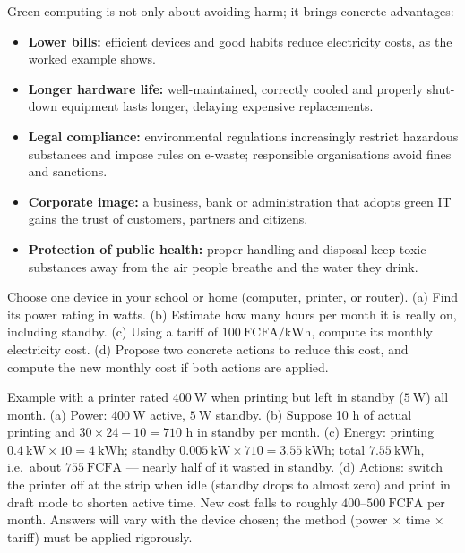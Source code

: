 \documentclass[11pt]{article}
\newcounter{popsec}
\newcounter{popsub}
\newcommand{\courssub}[1]{%
  \stepcounter{popsub}%
  \par\vspace{9pt}\noindent{\popxbold\fontsize{11.5}{13}\selectfont\color{popink}{\color{poporange}\thepopsec.\thepopsub}\hspace{6pt}#1}\par\nopagebreak\vspace{4pt}
}
\begin{document}
\courssub{Benefits of Green Computing}

Green computing is not only about avoiding harm; it brings concrete advantages:

\begin{itemize}
\item \textbf{Lower bills:} efficient devices and good habits reduce electricity costs, as the worked example shows.
\item \textbf{Longer hardware life:} well-maintained, correctly cooled and properly shut-down equipment lasts longer, delaying expensive replacements.
\item \textbf{Legal compliance:} environmental regulations increasingly restrict hazardous substances and impose rules on e-waste; responsible organisations avoid fines and sanctions.
\item \textbf{Corporate image:} a business, bank or administration that adopts green IT gains the trust of customers, partners and citizens.
\item \textbf{Protection of public health:} proper handling and disposal keep toxic substances away from the air people breathe and the water they drink.
\end{itemize}

\begin{exercice}
Choose one device in your school or home (computer, printer, or router). (a) Find its power rating in watts. (b) Estimate how many hours per month it is really on, including standby. (c) Using a tariff of $100\ \mathrm{FCFA/kWh}$, compute its monthly electricity cost. (d) Propose two concrete actions to reduce this cost, and compute the new monthly cost if both actions are applied.
\end{exercice}

\begin{corrige}[Exercise 1]
Example with a printer rated $400\ \mathrm{W}$ when printing but left in standby ($5\ \mathrm{W}$) all month. (a) Power: $400\ \mathrm{W}$ active, $5\ \mathrm{W}$ standby. (b) Suppose 10 h of actual printing and $30 \times 24 - 10 = 710$ h in standby per month. (c) Energy: printing $0.4\ \mathrm{kW} \times 10 = 4\ \mathrm{kWh}$; standby $0.005\ \mathrm{kW} \times 710 = 3.55\ \mathrm{kWh}$; total $7.55\ \mathrm{kWh}$, i.e.\ about $755\ \mathrm{FCFA}$ --- nearly half of it wasted in standby. (d) Actions: switch the printer off at the strip when idle (standby drops to almost zero) and print in draft mode to shorten active time. New cost falls to roughly $400$--$500\ \mathrm{FCFA}$ per month. Answers will vary with the device chosen; the method (power $\times$ time $\times$ tariff) must be applied rigorously.
\end{corrige}
\end{document}
